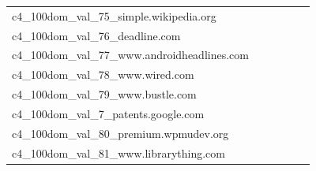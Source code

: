 \documentclass[dvipsnames]{article}
\begin{document}
\begin{appendix}
{\begin{longtable}{m{6cm}m{1.7cm}m{1.7cm}m{1.7cm}m{1.7cm}m{1.7cm}}
	c4\_100dom\_val\_75\_simple.wikipedia.org  & \colorbox[HTML]{ffffe5}{\makebox[\mywidth][c]{8.25}} & \colorbox[HTML]{f7fcbb}{\makebox[\mywidth][c]{7.85}} & \colorbox[HTML]{ffffe5}{\makebox[\mywidth][c]{8.37}} & \colorbox[HTML]{e0f2a8}{\makebox[\mywidth][c]{7.78}} & \colorbox[HTML]{77c578}{\makebox[\mywidth][c]{7.67}}\\
	c4\_100dom\_val\_76\_deadline.com  & \colorbox[HTML]{ffffe5}{\makebox[\mywidth][c]{14.75}} & \colorbox[HTML]{e3f4aa}{\makebox[\mywidth][c]{13.83}} & \colorbox[HTML]{ffffe5}{\makebox[\mywidth][c]{15.48}} & \colorbox[HTML]{f0f9b4}{\makebox[\mywidth][c]{13.92}} & \colorbox[HTML]{77c578}{\makebox[\mywidth][c]{13.51}}\\
	c4\_100dom\_val\_77\_www.androidheadlines.com  & \colorbox[HTML]{fefee3}{\makebox[\mywidth][c]{11.11}} & \colorbox[HTML]{e7f5ad}{\makebox[\mywidth][c]{10.74}} & \colorbox[HTML]{ffffe5}{\makebox[\mywidth][c]{11.43}} & \colorbox[HTML]{e0f2a8}{\makebox[\mywidth][c]{10.72}} & \colorbox[HTML]{77c578}{\makebox[\mywidth][c]{10.59}}\\
	c4\_100dom\_val\_78\_www.wired.com  & \colorbox[HTML]{fefee0}{\makebox[\mywidth][c]{14.42}} & \colorbox[HTML]{daf0a4}{\makebox[\mywidth][c]{13.88}} & \colorbox[HTML]{ffffe5}{\makebox[\mywidth][c]{15.14}} & \colorbox[HTML]{d9f0a3}{\makebox[\mywidth][c]{13.87}} & \colorbox[HTML]{77c578}{\makebox[\mywidth][c]{13.68}}\\
	c4\_100dom\_val\_79\_www.bustle.com  & \colorbox[HTML]{ffffe5}{\makebox[\mywidth][c]{12.79}} & \colorbox[HTML]{f3fab6}{\makebox[\mywidth][c]{12.33}} & \colorbox[HTML]{ffffe5}{\makebox[\mywidth][c]{13.19}} & \colorbox[HTML]{dff2a7}{\makebox[\mywidth][c]{12.25}} & \colorbox[HTML]{77c578}{\makebox[\mywidth][c]{12.09}}\\
	c4\_100dom\_val\_7\_patents.google.com  & \colorbox[HTML]{77c578}{\makebox[\mywidth][c]{7.59}} & \colorbox[HTML]{dff2a7}{\makebox[\mywidth][c]{7.84}} & \colorbox[HTML]{ffffe5}{\makebox[\mywidth][c]{9.33}} & \colorbox[HTML]{bbe395}{\makebox[\mywidth][c]{7.72}} & \colorbox[HTML]{7ac779}{\makebox[\mywidth][c]{7.59}}\\
	c4\_100dom\_val\_80\_premium.wpmudev.org  & \colorbox[HTML]{f9fdc9}{\makebox[\mywidth][c]{16.86}} & \colorbox[HTML]{eaf7af}{\makebox[\mywidth][c]{16.63}} & \colorbox[HTML]{ffffe5}{\makebox[\mywidth][c]{18.13}} & \colorbox[HTML]{d0ec9e}{\makebox[\mywidth][c]{16.50}} & \colorbox[HTML]{77c578}{\makebox[\mywidth][c]{16.29}}\\
	c4\_100dom\_val\_81\_www.librarything.com  & \colorbox[HTML]{fbfdd4}{\makebox[\mywidth][c]{14.36}} & \colorbox[HTML]{ddf1a6}{\makebox[\mywidth][c]{13.98}} & \colorbox[HTML]{ffffe5}{\makebox[\mywidth][c]{15.42}} & \colorbox[HTML]{c9e99b}{\makebox[\mywidth][c]{13.91}} & \colorbox[HTML]{77c578}{\makebox[\mywidth][c]{13.75}}\\

\end{longtable}}
\end{appendix}
\end{document}
